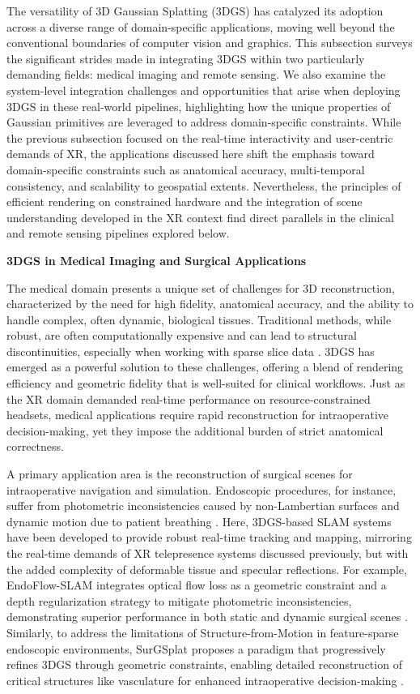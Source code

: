 \documentclass[11pt]{article}
\begin{document}
The versatility of 3D Gaussian Splatting (3DGS) has catalyzed its adoption across a diverse range of domain-specific applications, moving well beyond the conventional boundaries of computer vision and graphics. This subsection surveys the significant strides made in integrating 3DGS within two particularly demanding fields: medical imaging and remote sensing. We also examine the system-level integration challenges and opportunities that arise when deploying 3DGS in these real-world pipelines, highlighting how the unique properties of Gaussian primitives are leveraged to address domain-specific constraints. While the previous subsection focused on the real-time interactivity and user-centric demands of XR, the applications discussed here shift the emphasis toward domain-specific constraints such as anatomical accuracy, multi-temporal consistency, and scalability to geospatial extents. Nevertheless, the principles of efficient rendering on constrained hardware and the integration of scene understanding developed in the XR context find direct parallels in the clinical and remote sensing pipelines explored below.

\textbf{3DGS in Medical Imaging and Surgical Applications}

The medical domain presents a unique set of challenges for 3D reconstruction, characterized by the need for high fidelity, anatomical accuracy, and the ability to handle complex, often dynamic, biological tissues. Traditional methods, while robust, are often computationally expensive and can lead to structural discontinuities, especially when working with sparse slice data \cite{ref689}. 3DGS has emerged as a powerful solution to these challenges, offering a blend of rendering efficiency and geometric fidelity that is well-suited for clinical workflows. Just as the XR domain demanded real-time performance on resource-constrained headsets, medical applications require rapid reconstruction for intraoperative decision-making, yet they impose the additional burden of strict anatomical correctness.

A primary application area is the reconstruction of surgical scenes for intraoperative navigation and simulation. Endoscopic procedures, for instance, suffer from photometric inconsistencies caused by non-Lambertian surfaces and dynamic motion due to patient breathing \cite{ref690}. Here, 3DGS-based SLAM systems have been developed to provide robust real-time tracking and mapping, mirroring the real-time demands of XR telepresence systems discussed previously, but with the added complexity of deformable tissue and specular reflections. For example, EndoFlow-SLAM integrates optical flow loss as a geometric constraint and a depth regularization strategy to mitigate photometric inconsistencies, demonstrating superior performance in both static and dynamic surgical scenes \cite{ref690}. Similarly, to address the limitations of Structure-from-Motion in feature-sparse endoscopic environments, SurGSplat proposes a paradigm that progressively refines 3DGS through geometric constraints, enabling detailed reconstruction of critical structures like vasculature for enhanced intraoperative decision-making \cite{ref691}.
\end{document}
